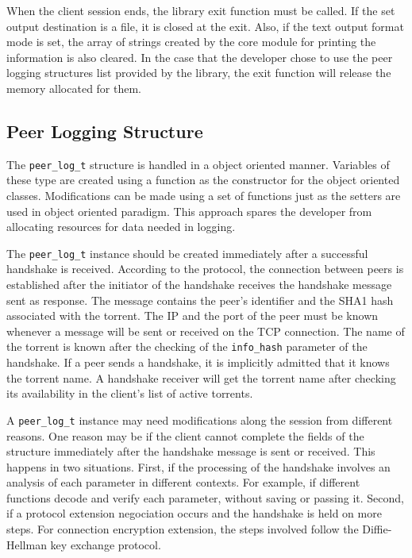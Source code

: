 When the client session ends, the library exit function must be called. If the
set output destination is a file, it is closed at the exit. Also, if the text
output format mode is set, the array of strings created by the core module for
printing the information is also cleared. In the case that the developer chose
to use the peer logging structures list provided by the library, the exit
function will release the memory allocated for them.

\subsection{Peer Logging Structure}

The \texttt{peer\_log\_t} structure is handled in a object oriented manner.
Variables of these type are created using a function as the constructor for
the object oriented classes. Modifications can be made using a set of
functions just as the setters are used in object oriented paradigm. This
approach spares the developer from allocating resources for data needed in
logging.

The \texttt{peer\_log\_t} instance should be created immediately after a
successful handshake is received. According to the protocol, the connection
between peers is established after the initiator of the handshake receives the
handshake message sent as response. The message contains the peer's identifier
and the SHA1 hash associated with the torrent. The IP and the port of the peer
must be known whenever a message will be sent or received on the TCP
connection. The name of the torrent  is known after the checking of the
\texttt{info\_hash} parameter of the handshake. If a peer sends a handshake,
it is implicitly admitted that it knows the torrent name. A handshake receiver
will get the torrent name after checking its availability in the client's list
of active torrents.

A \texttt{peer\_log\_t} instance may need modifications along the session from
different reasons. One reason may be if the client cannot complete the fields
of the structure immediately after the handshake message is sent or received.
This happens in two situations. First, if the processing of the handshake
involves an analysis of each parameter in different contexts. For example, if
different functions decode and verify each parameter, without saving or
passing it.  Second, if a protocol extension negociation occurs and the
handshake is held on more steps. For connection encryption extension, the
steps involved follow the Diffie-Hellman key exchange protocol.

